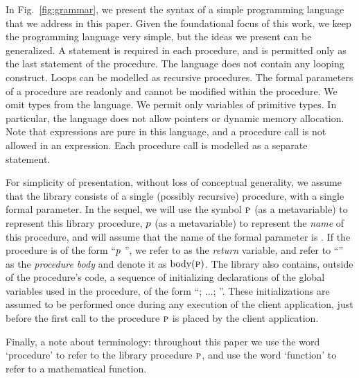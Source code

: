 In Fig.~\ref{fig:grammar}, we present the syntax of a simple
programming language that we address in this paper.
Given the foundational focus of this work, we keep the programming
language very simple, but the ideas we present can be generalized.
A  statement is required in each procedure,
and is permitted only as the last
statement of the procedure.
The language does not contain any looping construct.
Loops can be modelled as recursive procedures.
The formal parameters of a procedure are readonly and cannot be
modified within the procedure.
We omit types from the language. We permit only variables of primitive types.
In particular, the language does not allow pointers or dynamic memory allocation.
Note that expressions are pure in this language, and a procedure call
is not allowed in an expression. Each procedure call is modelled as a
separate statement.

For simplicity of presentation, without loss of conceptual generality, we assume
that the library consists of a single (possibly recursive) procedure, with a single formal
parameter.
In the sequel, we will use the symbol $\textsc{p}$ (as a metavariable) to
represent this library procedure, $p$ (as a metavariable) to
represent the \emph{name} of this procedure, and will assume that the name
of the formal parameter is . 
If the procedure is of the form ``$p$ '', we refer to  as the \emph{return}
variable, and  refer to ``'' as the \emph{procedure body}
and denote it as $\text{body}(\textsc{p})$.
The library also contains, outside of the procedure's code,
a sequence of initializing declarations of
the global variables used in the procedure, of the form ``;
$\ldots$; ''. These initializations are assumed to be
performed  once during any execution of the client application,
just before the first call to the
procedure $\textsc{p}$ is placed by the client application.

 Finally, a note about terminology: throughout this paper we
 use the word `procedure' to refer to the library procedure $\textsc{p}$, and
 use the word
`function' to refer to a mathematical function.
